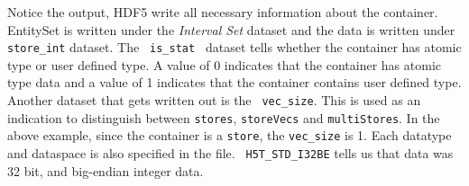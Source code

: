 \par Notice the output, HDF5 write all necessary information about the
container. EntitySet is written under the {\em Interval Set} dataset
and the data is written under {\tt store\_int} dataset. The {\tt
  is\_stat } dataset tells whether the container has atomic type or
user defined type. A value of 0 indicates that the container has atomic 
type data and a value of 1 indicates that the container contains user
defined type. Another dataset that gets written out is the {\tt
  vec\_size}. This is used as an indication to distinguish between
{\tt stores}, {\tt storeVecs} and {\tt multiStores}. In the above
example, since the container is a {\tt store}, the {\tt vec\_size} is
1. Each datatype and dataspace is also specified in the file. {\tt
  H5T\_STD\_I32BE} tells us that data was 32 bit, and big-endian
integer data.   
%

